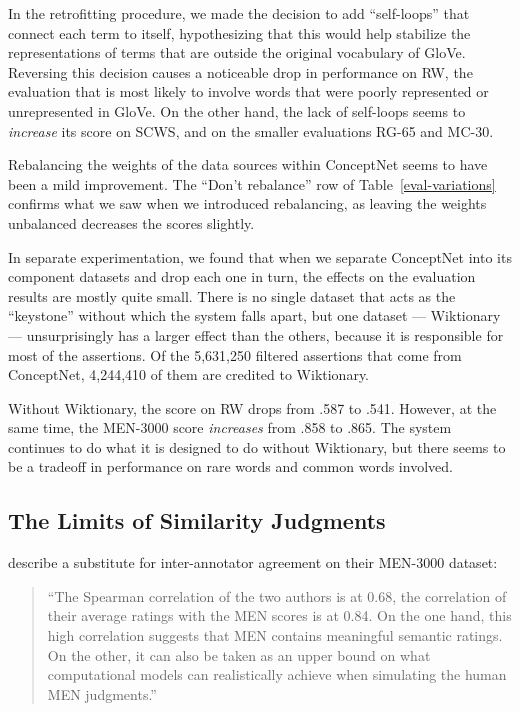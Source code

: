 \documentclass[11pt]{article}
\begin{document}
In the retrofitting procedure, we made the decision to add ``self-loops'' that
connect each term to itself, hypothesizing that this would help stabilize the
representations of terms that are outside the original vocabulary of GloVe.
Reversing this decision causes a noticeable drop in performance on RW, the
evaluation that is most likely to involve words that were poorly represented or
unrepresented in GloVe. On the other hand, the lack of self-loops seems to {\em
increase} its score on SCWS, and on the smaller evaluations RG-65 and MC-30.

Rebalancing the weights of the data sources within ConceptNet seems to have
been a mild improvement. The ``Don't rebalance'' row of Table~\ref{eval-variations}
confirms what we saw when we introduced rebalancing,
as leaving the weights unbalanced decreases the scores slightly.

In separate experimentation, we found that when we separate ConceptNet into its
component datasets and drop each one in turn, the effects on the evaluation
results are mostly quite small. There is no single dataset that acts as the
``keystone'' without which the system falls apart, but one dataset ---
Wiktionary --- unsurprisingly has a larger effect than the others, because it
is responsible for most of the assertions. Of the 5,631,250 filtered assertions
that come from ConceptNet, 4,244,410 of them are credited to Wiktionary.

Without Wiktionary, the score on RW drops from .587 to .541. However, at the
same time, the MEN-3000 score {\em increases} from .858 to .865. The system
continues to do what it is designed to do without Wiktionary, but there seems to
be a tradeoff in performance on rare words and common words involved.

\subsection{The Limits of Similarity Judgments}

 describe a substitute for inter-annotator agreement on
their MEN-3000 dataset:

\begin{quote}
``The Spearman correlation of the two authors is at 0.68, the correlation of their
average ratings with the MEN scores is at 0.84. On the one hand, this high
correlation suggests that MEN contains meaningful semantic ratings. On the
other, it can also be taken as an upper bound on what computational models can
realistically achieve when simulating the human MEN judgments.''
\end{quote}
\end{document}
